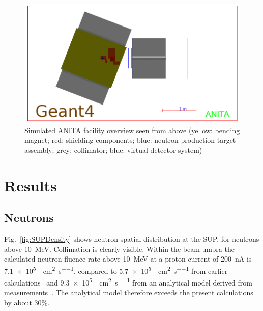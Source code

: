 \documentclass[peerreviewca,11pt,a4paper]{IEEEtran}
\let\MYoriglatexcaption\caption
\renewcommand{\caption}[2][\relax]{\MYoriglatexcaption[#2]{#2}}
\begin{document}
\begin{figure}[t]
	\centering
	\includegraphics[width=\columnwidth]{overview.png}
	\caption{
        Simulated ANITA facility overview seen from above (yellow: bending magnet; red: shielding components; blue: neutron production target assembly; grey: collimator; blue: virtual detector system)
    }
	\label{fig:ANITAoverview}
\end{figure}

\section{Results}

\subsection{Neutrons}
Fig.~\ref{fig:SUPDensity} shows neutron spatial distribution at the SUP, for neutrons above \SI{10}{\MeV}.
Collimation is clearly visible.
Within the beam umbra the calculated neutron fluence rate above \SI{10}{\MeV} at a proton current of \SI{200}{\nA} is \SI{7.1e5}{\neutron\per\cm\squared\per\second}, compared to \SI{5.7e5}{\neutron\per\cm\squared\per\second} from earlier calculations~\cite{Platt2013} and \SI{9.3e5}{\neutron\per\cm\squared\per\second} from an analytical model derived from measurements~\cite{Prokofiev2009}.
The analytical model therefore exceeds the present calculations by about 30\%.
\end{document}
